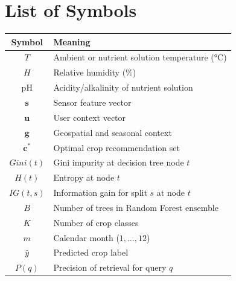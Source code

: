 \chapter*{List of Symbols}
\begin{tabular}{@{}cl@{}}
\toprule
\textbf{Symbol} & \textbf{Meaning} \\
\midrule
$T$ & Ambient or nutrient solution temperature (\si{\celsius}) \\
$H$ & Relative humidity (\%) \\
$\mathrm{pH}$ & Acidity/alkalinity of nutrient solution \\
$\mathbf{s}$ & Sensor feature vector \\
$\mathbf{u}$ & User context vector \\
$\mathbf{g}$ & Geospatial and seasonal context \\
$\mathbf{c}^*$ & Optimal crop recommendation set \\
$Gini(t)$ & Gini impurity at decision tree node $t$ \\
$H(t)$ & Entropy at node $t$ \\
$IG(t,s)$ & Information gain for split $s$ at node $t$ \\
$B$ & Number of trees in Random Forest ensemble \\
$K$ & Number of crop classes \\
$m$ & Calendar month ($1,\ldots,12$) \\
$\hat{y}$ & Predicted crop label \\
$P(q)$ & Precision of retrieval for query $q$ \\
\bottomrule
\end{tabular}
